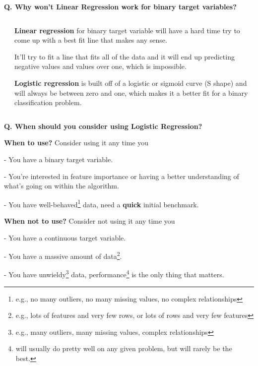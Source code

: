 \begin{frame}[fragile]{\textbf{Q. Why won't Linear Regression work for binary target variables?}}
\begin{columns}[T]
\begin{column}{.58\textwidth}
{{      }
    }
  \end{column}
  \hfill
  \begin{column}{.4\textwidth}
    \footnotesize
    \begin{wideitemize}
    \item<1-> \textbf{Linear regression} for binary target variable will have a hard time
    try to come up with a best fit line that makes any sense.
    \item<2-> It'll try to fit a line that fits all of the data and it will end up
    predicting negative values and values over one, which is impossible.
    \item<3-> \textbf{Logistic regression} is built off of a logistic or sigmoid curve (S shape)
    and will always be between zero and one, which makes it a better fit for a binary classification problem.
    \end{wideitemize}
    \end{column}
  \end{columns}
\end{frame}


\begin{frame}[fragile]{\textbf{Q. When should you consider using Logistic Regression?}}
  \begin{wideitemize}
  \item \textbf{When to use?} Consider using it any time you
  \begin{wideitemize}\setlength{\itemsep}{0.6em}
  \item[-] You have a binary target variable.
  \item[-] You're interested in feature importance or having a better understanding
  of what's going on within the algorithm.
  \item[-] You have well-behaved\footnote{e.g., no many outliers, no many missing
  values, no complex relationships} data, need a \textbf{quick} initial benchmark.
  \end{wideitemize}
  \item \textbf{When not to use?} Consider not using it any time you
  \begin{wideitemize}\setlength{\itemsep}{0.6em}
  \item[-] You have a continuous target variable.
  \item[-] You have a massive amount of data\footnote{e.g., lots of features and
  very few rows, or lots of rows and very few features}.
  \item[-] You have unwieldy\footnote{e.g., many outliers, many missing
  values, complex relationships} data, performance\footnote{will usually do pretty
  well on any given problem, but will rarely be the best.} is the only thing that matters.
  \end{wideitemize}
  \end{wideitemize}
\end{frame}

